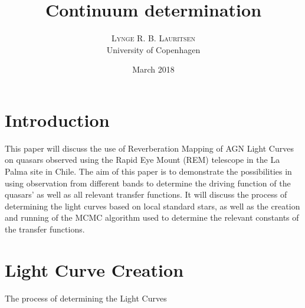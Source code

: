 \documentclass[twocolumn]{article}
\title{\vspace{-20mm}\fontsize{16pt}{10pt}\selectfont\textbf{Continuum determination}} %
\author{
\textsc{Lynge R. B. Lauritsen} \\
\normalsize University of Copenhagen \\ %
\date{March 2018}
\vspace{-9mm}
}
\begin{document}
\begin{multicols}{1}
\maketitle %
\end{multicols}{}







\section{Introduction}
This paper will discuss the use of Reverberation Mapping of AGN Light Curves on quasars observed using the Rapid Eye Mount (REM) telescope in the La Palma site in Chile. The aim of this paper is to demonstrate the possibilities in using observation from different bands to determine the driving function of the quasars' as well as all relevant transfer functions. It will discuss the process of determining the light curves based on local standard stars, as well as the creation and running of the MCMC algorithm used to determine the relevant constants of the transfer functions.

\section{Light Curve Creation}
The process of determining the Light Curves 
\end{document}
